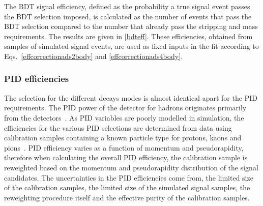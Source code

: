 The BDT signal efficiency, defined as the probability a true signal event passes the BDT selection imposed, is calculated as the number of events that pass the BDT selection compared to the number that already pass the stripping and mass requirements. The results are given in \tab\ref{bdteff}. These efficiencies, obtained from samples of simulated signal events, are used as fixed inputs in the \CP fit according to Eqs.~\ref{effcorrectionads2body} and \ref{effcorrectionads4body}. 

\begin{table}[h]
\centering
{}
\caption{Summary of the BDT efficiencies used in the \CP fit.}
\label{bdteff}
\end{table}


\subsubsection{PID efficiencies}
\label{sec:cpfit:efficiencies:pid}

The selection for the different \Dz decays modes is almost identical apart for the PID requirements. The PID power of the detector for hadrons originates primarily from the \rich detectors~\cite{LHCb-DP-2012-003,richrun2}. As PID variables are poorly modelled in \lhcb simulation, the efficiencies for the various PID selections are determined from data using calibration samples containing a known particle type for protons, kaons and pions~\cite{LHCb-PUB-2016-021,LHCb-PUB-2016-005}. PID efficiency varies as a function of momentum and pseudorapidity, therefore when calculating the overall PID efficiency, the calibration sample is reweighted based on the momentum and pseudorapidity distribution of the signal candidates. The uncertainties in the PID efficiencies come from, the limited size of the calibration samples, the limited size of the simulated signal samples, the reweighting procedure itself and the effective purity of the calibration samples.

